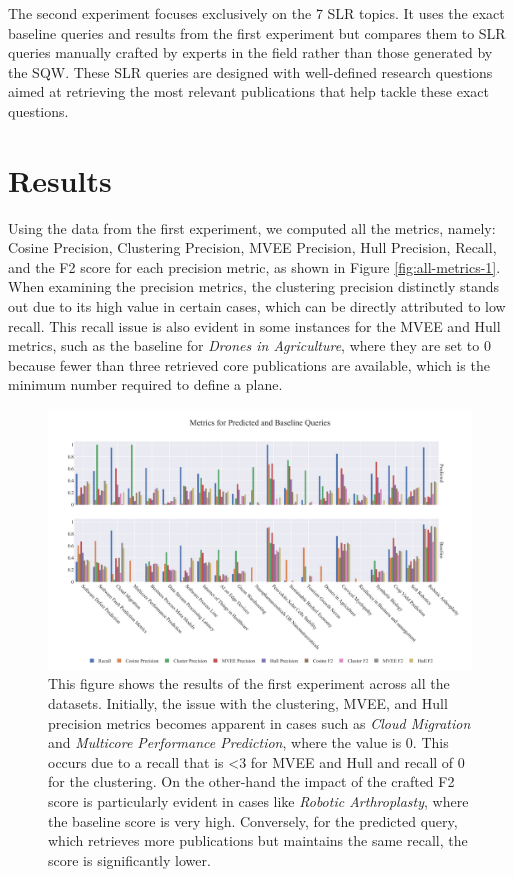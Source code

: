 The second experiment focuses exclusively on the 7 SLR topics. It uses the exact baseline queries and results from the first experiment but compares them to SLR queries manually crafted by experts in the field rather than those generated by the SQW. These SLR queries are designed with well-defined research questions aimed at retrieving the most relevant publications that help tackle these exact questions.

\section{Results}
Using the data from the first experiment, we computed all the metrics, namely: Cosine Precision, Clustering Precision, MVEE Precision, Hull Precision, Recall, and the F2 score for each precision metric, as shown in Figure \autoref{fig:all-metrics-1}. When examining the precision metrics, the clustering precision distinctly stands out due to its high value in certain cases, which can be directly attributed to low recall. This recall issue is also evident in some instances for the MVEE and Hull metrics, such as the baseline for \textit{Drones in Agriculture}, where they are set to 0 because fewer than three retrieved core publications are available, which is the minimum number required to define a plane.

\begin{figure}[!b]
	\hspace*{-1cm}	
	\includegraphics[scale=0.45]{pics/all-metrics-1.pdf}
	\caption[Evaluation: Experiment 1]{This figure shows the results of the first experiment across all the datasets. Initially, the issue with the clustering, MVEE, and Hull precision metrics becomes apparent in cases such as \textit{Cloud Migration} and \textit{Multicore Performance Prediction}, where the value is 0. This occurs due to a recall that is <3 for MVEE and Hull and recall of 0 for the clustering. On the other-hand the impact of the crafted F2 score is particularly evident in cases like \textit{Robotic Arthroplasty}, where the baseline score is very high. Conversely, for the predicted query, which retrieves more publications but maintains the same recall, the score is significantly lower.}\label{fig:all-metrics-1}
\end{figure}

